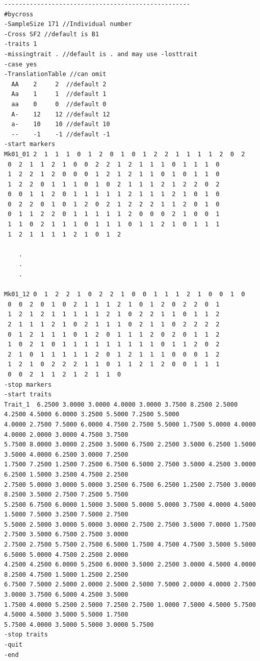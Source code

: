 \documentclass[12pt]{article}
\begin{document}
{\scriptsize
\begin{verbatim}
---------------------------------------------------
#bycross
-SampleSize 171 //Individual number
-Cross SF2 //default is B1
-traits 1
-missingtrait . //default is . and may use -losttrait
-case yes
-TranslationTable //can omit
  AA    2     2  //default 2
  Aa    1     1  //default 1
  aa    0     0  //default 0
  A-    12    12 //default 12
  a-    10    10 //default 10
  --    -1    -1 //default -1
-start markers
Mk01_01 2  1  1  1  0  1  2  0  1  0  1  2  2  1  1  1  1  2  0  2 
 0  2  1  1  2  1  0  0  2  2  1  2  1  1  1  0  1  1  1  0 
 1  2  2  1  2  0  0  0  1  2  1  2  1  1  0  1  0  1  1  0 
 1  2  2  0  1  1  1  0  1  0  2  1  1  1  2  1  2  2  0  2 
 0  0  1  1  2  0  1  1  1  1  1  2  1  1  1  2  1  0  1  0 
 0  2  2  0  1  0  1  2  0  2  1  2  2  2  1  1  2  0  1  0 
 0  1  1  2  2  0  1  1  1  1  1  2  0  0  0  2  1  0  0  1 
 1  1  0  2  1  1  1  0  1  1  1  0  1  1  2  1  0  1  1  1 
 1  2  1  1  1  1  2  1  0  1  2 
    
    .
    .
    .

Mk01_12 0  1  2  2  1  0  2  2  1  0  0  1  1  1  2  1  0  0  1  0 
 0  0  2  0  1  0  2  1  1  1  2  1  0  1  2  0  2  2  0  1 
 1  2  1  2  1  1  1  1  1  2  1  0  2  2  1  1  0  1  1  2 
 2  1  1  1  2  1  0  2  1  1  1  0  2  1  1  0  2  2  2  2 
 0  1  2  1  1  1  0  1  2  0  1  1  1  2  0  2  0  1  1  2 
 1  0  2  1  0  1  1  1  1  1  1  1  1  1  0  1  1  2  0  2 
 2  1  0  1  1  1  1  1  2  0  1  2  1  1  1  0  0  0  1  2 
 1  2  1  0  2  2  2  1  1  0  1  1  2  1  2  0  0  1  1  1 
 0  0  2  1  1  2  1  2  1  1  0 
-stop markers
-start traits
Trait_1  6.2500 3.0000 3.0000 4.0000 3.0000 3.7500 8.2500 2.5000 4.2500 4.5000 6.0000 3.2500 5.5000 7.2500 5.5000 
4.0000 2.7500 7.5000 6.0000 4.7500 2.7500 5.5000 1.7500 5.0000 4.0000 4.0000 2.0000 3.0000 4.7500 3.7500 
5.7500 8.0000 3.0000 2.2500 3.5000 6.7500 2.2500 3.5000 6.2500 1.5000 3.5000 4.0000 6.2500 3.0000 7.2500 
1.7500 7.2500 1.2500 7.2500 6.7500 6.5000 2.7500 3.5000 4.2500 3.0000 6.2500 1.5000 3.2500 4.7500 2.2500 
2.7500 5.0000 3.0000 5.0000 3.2500 6.7500 6.2500 1.2500 2.7500 3.0000 8.2500 3.5000 2.7500 7.2500 5.7500 
5.2500 6.7500 6.0000 1.5000 3.5000 5.0000 5.0000 3.7500 4.0000 4.5000 1.5000 7.5000 3.2500 7.5000 2.7500 
5.5000 2.5000 3.0000 5.0000 3.0000 2.7500 2.7500 3.5000 7.0000 1.7500 2.7500 3.5000 6.7500 2.7500 3.0000 
2.7500 2.7500 5.7500 2.7500 6.5000 1.7500 4.7500 4.7500 3.5000 5.5000 6.5000 5.0000 4.7500 2.2500 2.0000 
4.2500 4.2500 6.0000 5.2500 6.0000 3.5000 2.2500 3.0000 4.5000 4.0000 8.2500 4.7500 1.5000 1.2500 2.2500 
6.7500 7.5000 2.5000 2.0000 2.5000 2.5000 7.5000 2.0000 4.0000 2.7500 3.0000 3.7500 6.5000 4.2500 3.5000 
1.7500 4.0000 5.2500 2.5000 7.2500 2.7500 1.0000 7.5000 4.5000 5.7500 4.5000 4.5000 3.5000 5.5000 1.7500 
5.7500 4.0000 3.5000 5.5000 3.0000 5.7500 
-stop traits
-quit
-end
\end{verbatim}
}
\end{document}
